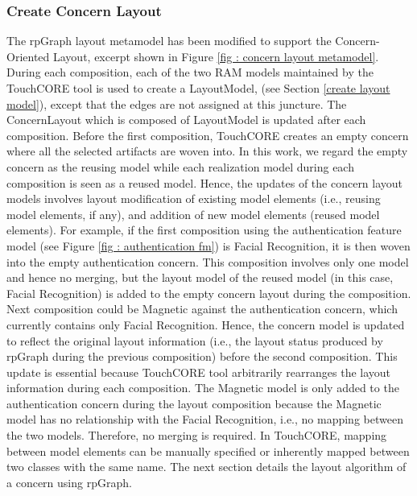 \subsubsection{Create Concern Layout}
The rpGraph layout metamodel has been modified to support the Concern-Oriented Layout, excerpt shown in Figure \ref{fig : concern layout metamodel}. During each composition, each of the two RAM models maintained by the TouchCORE tool is used to create a LayoutModel, (see Section \ref{create layout model}), except that the edges are not assigned at this juncture. The ConcernLayout which is composed of LayoutModel is updated after each composition. Before the first composition, TouchCORE creates an empty concern where all the selected artifacts are woven into. In this work, we regard the empty concern as the reusing model while each realization model during  each composition is seen as a reused model. Hence, the updates of the concern layout models involves layout  modification of existing model elements (i.e., reusing model elements, if any), and addition of new model elements (reused model elements). For example, if the first composition using the authentication feature model (see Figure \ref{fig : authentication fm}) is Facial Recognition,  it is then woven into the empty authentication concern. This composition involves only one model and hence no merging, but the layout model of the reused model (in this case, Facial Recognition) is added to the empty concern layout during the composition. Next composition could be Magnetic against the authentication concern, which currently contains only Facial Recognition. Hence, the concern model is updated to reflect the original layout information (i.e., the layout status produced by rpGraph during the previous composition)  before the second composition. This update is essential because TouchCORE tool arbitrarily rearranges the layout information during each composition.  The Magnetic model is only added to the authentication concern during the layout composition because the Magnetic model has no relationship with the Facial Recognition, i.e., no mapping between the two models. Therefore, no merging is required. In TouchCORE, mapping between model elements can be manually specified  or inherently mapped between two classes with the same name.  The next section details the layout algorithm of a concern using rpGraph.

